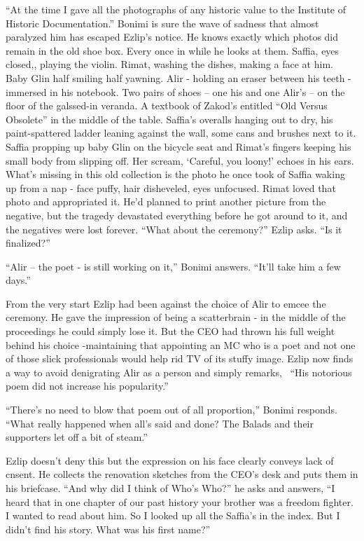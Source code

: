 \documentclass[twoside,11pt]{book}
\begin{document}
``At the time I gave all the photographs of any historic value to the Institute of Historic
Documentation.'' Bonimi is sure the wave of sadness that almost paralyzed him has escaped Ezlip's
notice. He knows exactly which photos did remain in the old shoe box. Every once in while he looks at them. Saffia,
eyes closed,, playing the violin. Rimat, washing the dishes, making a face at him. Baby Glin half smiling half yawning.
Alir - holding an eraser between his teeth - immersed in his notebook. Two pairs of shoes -- one his
and one Alir's -- on the floor of the galssed-in veranda. A textbook of Zakod's entitled ``Old Versus
Obsolete'' in the middle of the table. Saffia's overalls hanging out to dry, his paint-spattered ladder
leaning against the wall, some cans and brushes next to it.  Saffia propping up baby Glin on the bicycle seat
and Rimat's fingers keeping his small body from slipping off.  Her scream, `Careful, you loony!' echoes in his ears.
What's missing in this old collection is the photo he once took of Saffia waking up from a nap - face puffy, hair
disheveled, eyes
unfocused.  Rimat loved that photo and appropriated it. He'd planned to print another picture from the negative, but
the tragedy devastated everything before he got around to it, and the negatives were lost forever. ``What
about the ceremony?'' Ezlip asks. ``Is it finalized?''

``Alir -- the poet - is still working on it,'' Bonimi answers. ``It'll take him a
few days.''

From the very start Ezlip had been against the choice of Alir to emcee the ceremony. He gave the impression of being a
scatterbrain - in the middle of the proceedings he could simply lose it. But the CEO had thrown his full weight behind
his choice -maintaining that appointing an MC who is a poet and not one of those slick professionals would help rid TV
of its stuffy image.  Ezlip now finds a way to avoid denigrating Alir as a person and simply remarks,
\ ``His notorious poem did not increase his popularity.''

``There's no need to blow that poem out of all proportion,'' Bonimi responds.
``What really happened when all's said and done? The Balads and their supporters let off a bit of
steam.''

Ezlip doesn't deny this but the expression on his face clearly conveys lack of cnsent. He collects the renovation
sketches from the CEO's desk and puts them in his briefcase. ``And why did I think of Who's
Who?'' he asks and answers, ``I heard that in one chapter of our past history your brother
was a freedom fighter. I wanted to read about him. So I looked up all the Saffia's in the index. But I didn't find his
story. What was his first name?''
\end{document}
